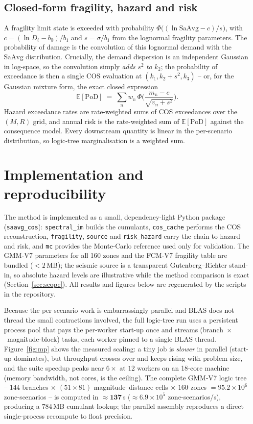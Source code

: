 \documentclass[11pt,a4paper]{article}
\newcommand{\saavg}{\mathrm{SaAvg}}
\newcommand{\E}{\mathbb{E}}
\begin{document}
\subsection{Closed-form fragility, hazard and risk}
A fragility limit state is exceeded with probability
$\Phi\big((\ln\saavg-c)/s\big)$, with $c=(\ln D_\ell-b_0)/b_1$ and
$s=\sigma/b_1$ from the lognormal fragility parameters. The probability of damage
is the convolution of this lognormal demand with the $\saavg$ distribution.
Crucially, the demand dispersion is an independent Gaussian in log-space, so the
convolution simply \emph{adds $s^2$ to $k_2$}; the probability of exceedance is
then a single COS evaluation at $(k_1,k_2+s^2,k_3)$ -- or, for the Gaussian
mixture form, the exact closed expression
\begin{equation}
  \E[\text{PoD}]\;=\;\sum_n w_n\,
  \Phi\!\Big(\frac{m_n-c}{\sqrt{v_n+s^2}}\Big).
  \label{eq:pod}
\end{equation}
Hazard exceedance rates are rate-weighted sums of COS exceedances over the
$(M,R)$ grid, and annual risk is the rate-weighted sum of $\E[\text{PoD}]$
against the consequence model. Every downstream quantity is linear in the
per-scenario distribution, so logic-tree marginalisation is a weighted sum.

\section{Implementation and reproducibility}
The method is implemented as a small, dependency-light Python package
(\texttt{saavg\_cos}): \texttt{spectral\_im} builds the cumulants,
\texttt{cos\_cache} performs the COS reconstruction, \texttt{fragility},
\texttt{source} and \texttt{risk\_hazard} carry the chain to hazard and risk, and
\texttt{mc} provides the Monte-Carlo reference used only for validation. The
GMM-V7 parameters for all 160 zones and the FCM-V7 fragility table are bundled
($<2$\,MB); the seismic source is a transparent Gutenberg--Richter stand-in, so
absolute hazard levels are illustrative while the method comparison is exact
(Section~\ref{sec:scope}). All results and figures below are regenerated by the
scripts in the repository.

Because the per-scenario work is embarrassingly parallel and BLAS does not
thread the small contractions involved, the full logic-tree run uses a persistent
process pool that pays the per-worker start-up once and streams
(branch~$\times$~magnitude-block) tasks, each worker pinned to a single BLAS
thread. Figure~\ref{fig:mp} shows the measured scaling: a tiny job is
\emph{slower} in parallel (start-up dominates), but throughput crosses over and
keeps rising with problem size, and the suite speedup peaks near
$6\times$ at $12$ workers on an 18-core machine (memory bandwidth, not cores, is
the ceiling). The complete GMM-V7 logic tree -- $144$ branches
$\times$ $(51\times81)$ magnitude--distance cells $\times$ $160$ zones
$=95.2\times10^6$ zone-scenarios -- is computed in $\mathbf{\approx137}$\,s
($\approx6.9\times10^5$ zone-scenarios/s), producing a $784$\,MB cumulant lookup;
the parallel assembly reproduces a direct single-process recompute to float
precision.
\end{document}
